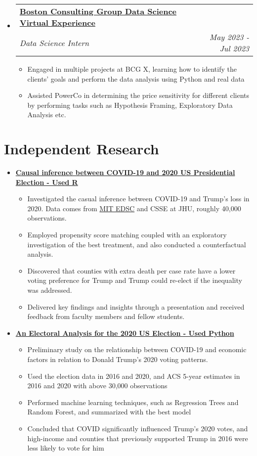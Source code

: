 \documentclass[letterpaper]{article}
\makeatletter
\newcommand{\resumeItem}[1]{
  \renewcommand{\labelitemi}{-} %
  \item{\fontsize{12}{12}\selectfont
    {#1 \vspace{-1.5pt}}
  }
}
\newcommand{\resumeSubheading}[4]{
  \vspace{-3pt}\item
    \begin{tabular*}{1.0\textwidth}[t]{l@{\extracolsep{\fill}}r}
      {\fontsize{12}{12}\selectfont\textbf{#1}} & {\fontsize{12}{12}\selectfont{#2}} \\
      {\fontsize{12}{12}\selectfont\textit{#3}} & {\fontsize{12}{12}\selectfont\textit{#4}} \\
    \end{tabular*}\vspace{-7pt}
}
\newcommand{\resumeSubheadingsingle}[1]{
  \vspace{-3pt}\item
      {\fontsize{12}{12}\selectfont\textbf{#1}}\\
  \vspace{-7pt}
}
\newcommand{\resumeSubHeadingListStart}{\begin{itemize}[leftmargin=0.0in, label={}]}
\newcommand{\resumeSubHeadingListEnd}{\end{itemize}}
\newcommand{\resumeItemListStart}{\begin{itemize}}
\newcommand{\resumeItemListEnd}{\end{itemize}\vspace{-5pt}}
\makeatother
\begin{document}
\resumeSubHeadingListStart
\resumeSubheading
{\href{https://www.theforage.com/simulations/bcg/data-science-ccdz}{Boston Consulting Group Data Science Virtual Experience}}{Remote}{Data Science Intern}{May 2023 - Jul 2023}
\resumeItemListStart
\resumeItem{Engaged in multiple projects at BCG X, learning how to identify the clients’ goals and perform the data analysis using Python and real data}
\resumeItem{Assisted PowerCo in determining the price sensitivity for different clients by performing tasks such as Hypothesis Framing, Exploratory Data Analysis etc.}
\resumeItemListEnd
\resumeSubHeadingListEnd
\vspace{-5pt}



\section{Independent Research}
\resumeSubHeadingListStart
\resumeSubheadingsingle
{\href{https://github.com/yiliuc/covid_and_trump_loss}{Causal inference between COVID-19 and 2020 US Presidential Election - Used R}}
\resumeItemListStart
\resumeItem{Investigated the casual inference between COVID-19 and Trump’s loss in 2020. Data comes from \href{https://electionlab.mit.edu/data}{MIT EDSC} and CSSE at JHU, roughly 40,000 observations.}
\resumeItem{Employed propensity score matching coupled with an exploratory investigation of the best treatment, and also conducted a counterfactual analysis.}
\resumeItem{Discovered that counties with extra death per case rate have a lower voting preference for Trump and Trump could re-elect if the inequality was addressed.}
\resumeItem{Delivered key findings and insights through a presentation and received feedback from faculty members and fellow students.}
\resumeItemListEnd
\resumeSubHeadingListEnd

\resumeSubHeadingListStart
\resumeSubheadingsingle
{\href{https://github.com/yiliuc/change_vote_trump_covid}{An Electoral Analysis for the 2020 US Election - Used Python}}
\resumeItemListStart
\resumeItem{Preliminary study on the relationship between COVID-19 and economic factors in relation to Donald Trump's 2020 voting patterns.}
\resumeItem{Used the election data in 2016 and 2020, and ACS 5-year estimates in 2016 and 2020 with above 30,000 observations}
\resumeItem{Performed machine learning techniques, such as Regression Trees and Random Forest, and summarized with the best model}
\resumeItem{Concluded that COVID significantly influenced Trump's 2020 votes, and high-income and counties that previously supported Trump in 2016 were less likely to vote for him}
\resumeItemListEnd
\resumeSubHeadingListEnd
\end{document}
